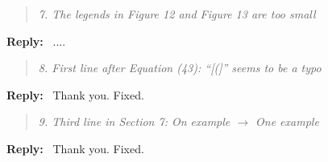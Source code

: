 \documentclass[11pt]{article}
\newenvironment{response}{%
  \vspace{1em}
  \begin{quote}\itshape
}{%
  \end{quote}
  \noindent\textbf{Reply:}~
}
\begin{document}
\begin{response}{7.}
    The legends in Figure 12 and Figure 13 are too small
\end{response}
....


\begin{response}{8.}
    First line after Equation (43): “[(]” seems to be a typo
\end{response}
Thank you. Fixed.


\begin{response}{9.}
    Third line in Section 7: On example $\rightarrow$ One example
\end{response}
Thank you. Fixed.
\end{document}
